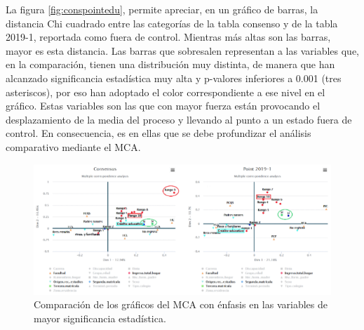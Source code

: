 \documentclass[water,article,submit,moreauthors,pdftex]{mdpi}
\begin{document}
La figura \ref{fig:conspointedu}, permite apreciar, en un gráfico de
barras, la distancia Chi cuadrado entre las categorías de la tabla
consenso y de la tabla 2019-1, reportada como fuera de control. Mientras
más altas son las barras, mayor es esta distancia. Las barras que
sobresalen representan a las variables que, en la comparación, tienen
una distribución muy distinta, de manera que han alcanzado significancia
estadística muy alta y p-valores inferiores a 0.001 (tres asteriscos),
por eso han adoptado el color correspondiente a ese nivel en el gráfico.
Estas variables son las que con mayor fuerza están provocando el
desplazamiento de la media del proceso y llevando al punto a un estado
fuera de control. En consecuencia, es en ellas que se debe profundizar
el análisis comparativo mediante el MCA.

\begin{figure}[!ht]



\begin{center}\includegraphics[width=0.6\linewidth,]{mcacompedu} \end{center}

\caption{Comparación de los gráficos del MCA con énfasis en las variables de mayor significancia estadística.}

\label{fig:mcapointedu}
\end{figure}
\end{document}
